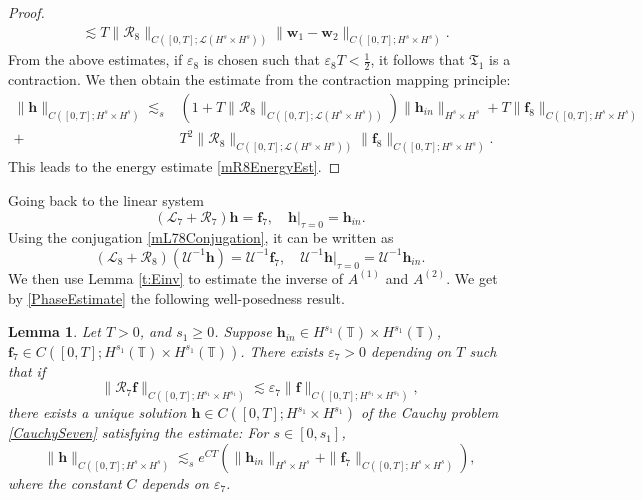 \documentclass[12pt]{amsart}
\newtheorem{lemma}[theorem]{Lemma}
\theoremstyle{remark}
\theoremstyle{definition}
\numberwithin{equation}{section}
\newcommand{\f}{\frac}
\newcommand{\T}{{\mathbb T}}
\newcommand{\mL}{\mathcal{L}}
\newcommand{\mR}{\mathcal{R}}
\newcommand{\mU}{\mathcal{U}}
\begin{document}
\begin{proof}
\begin{align*}
&\lesssim T\|\mR_8\|_{C([0,T]; \mL (H^s\times H^s))}\| \mathbf{w}_1-\mathbf{w}_2\|_{C([0,T]; H^s\times H^s)}.
\end{align*}
From the above estimates,  if $\varepsilon_8$ is chosen such that $\varepsilon_8 T<\f12$, it follows that $\mathfrak{T}_1$ is a contraction. 
We then obtain the estimate from the contraction mapping principle:
\begin{align*}
 \| \mathbf{h}\|_{C([0,T]; H^s\times H^s)} \lesssim_s& (1+ T\|\mR_8\|_{C([0,T]; \mL (H^s\times H^s))})\|\mathbf{h}_{in} \|_{H^s\times H^s} + T\| \mathbf{f}_8\|_{C([0,T]; H^s\times H^s)} \\
+& T^2 \|\mR_8\|_{C([0,T]; \mL (H^s\times H^s))} \| \mathbf{f}_8\|_{C([0,T]; H^s\times H^s)}.
\end{align*}
This leads to the energy estimate \eqref{mR8EnergyEst}.
\end{proof}

Going back to the linear system 
\begin{equation} \label{CauchySeven}
  (\mL_7 + \mR_7) \mathbf{h} = \mathbf{f}_7, \quad \mathbf{h}|_{\tau=0} = \mathbf{h}_{in}.
\end{equation}
Using the conjugation \eqref{mL78Conjugation}, it can be written as
\begin{equation*} 
 (\mL_8 + \mR_8) (\mU^{-1}\mathbf{h}) = \mU^{-1}\mathbf{f}_7, \quad \mU^{-1}\mathbf{h}|_{\tau=0} = \mU^{-1}\mathbf{h}_{in}.  
\end{equation*}
We then use Lemma \ref{t:Einv} to estimate the inverse of $A^{(1)}$ and $A^{(2)}$.
We get by \eqref{PhaseEstimate} the following well-posedness result.
\begin{lemma} \label{t:CauchySeven}
Let $T>0$, and $s_1\geq 0$.
Suppose $\mathbf{h}_{in} \in H^{s_1}(\T)\times H^{s_1}(\T)$, $\mathbf{f}_7\in C([0,T];H^{s_1}(\T)\times H^{s_1}(\T))$.
There exists $\varepsilon_7>0$ depending on $T$ such that if 
\begin{equation*}
 \|\mR_7 \mathbf{f} \|_{C([0,T];H^{s_1}\times H^{s_1})} \lesssim \varepsilon_7 \|\mathbf{f}\|_{C([0,T];H^{s_1}\times H^{s_1})},
\end{equation*}
there exists a unique solution $\mathbf{h}\in C([0,T];H^{s_1}\times H^{s_1})$ of the Cauchy problem \eqref{CauchySeven} satisfying the estimate:
For $s\in [0, s_1]$,
\begin{equation} \label{mR7EnergyEst}
 \| \mathbf{h}\|_{C([0,T]; H^s\times H^s)} \lesssim_s e^{CT}\left(\|\mathbf{h}_{in} \|_{H^s\times H^s} + \| \mathbf{f}_7\|_{C([0,T]; H^s\times H^s)}\right), 
\end{equation}
where the constant $C$ depends on $\varepsilon_7$.
\end{lemma}
\end{document}
